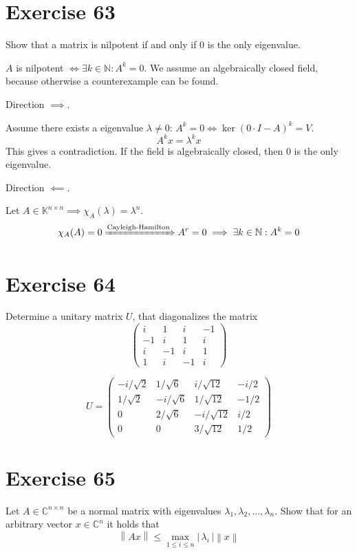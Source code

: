 \documentclass[a4paper]{article}
\theoremstyle{definition}
\newcommand\card[1]{\left|\,#1\,\right|}
\newcommand\norm[1]{\left\|{#1}\right\|}
\begin{document}
\section*{Exercise 63}
\begin{ex}
  Show that a matrix is nilpotent if and only if $0$ is the only eigenvalue.
\end{ex}

$A$ is nilpotent $\iff \exists k \in \mathbb N: A^k = 0$.
We assume an algebraically closed field, because otherwise a counterexample can be found.

Direction $\implies$.

Assume there exists a eigenvalue $\lambda \neq 0$: $A^k = 0 \iff \ker(0 \cdot I - A)^k = V$.
\[ A^k x = \lambda^k x \]
This gives a contradiction.
If the field is algebraically closed, then $0$ is the only eigenvalue.

Direction $\impliedby$.

Let $A \in \mathbb K^{n \times n} \implies \chi_A(\lambda) = \lambda^n$.
\[ \chi_A(A) = 0 \xRightarrow{\text{Cayleigh-Hamilton}} A^r = 0 \implies \exists k \in \mathbb N: A^k = 0 \]

\section*{Exercise 64}
\begin{ex}
  Determine a unitary matrix $U$, that diagonalizes the matrix
  \[
    \begin{pmatrix}
      i & 1 & i & -1 \\
      -1 & i & 1 & i \\
      i & -1 & i & 1 \\
      1 & i & -1 & i
    \end{pmatrix}
  \]
\end{ex}

\[
  U = \begin{pmatrix}
    -i/\sqrt{2} & 1/\sqrt{6}  & i/\sqrt{12}  & -i/2 \\
    1/\sqrt{2}  & -i/\sqrt{6} & 1/\sqrt{12}  & -1/2 \\
    0           & 2/\sqrt{6}  & -i/\sqrt{12} & i/2 \\
    0           & 0           & 3/\sqrt{12}  & 1/2
  \end{pmatrix}
\]

\section*{Exercise 65}
\begin{ex}
  Let $A \in \mathbb C^{n \times n}$ be a normal matrix with eigenvalues $\lambda_1, \lambda_2, \dots, \lambda_n$.
  Show that for an arbitrary vector $x \in \mathbb C^n$ it holds that
  \[ \norm{Ax} \leq \max_{1 \leq i \leq n} \card{\lambda_i} \norm{x} \]
\end{ex}
\end{document}
